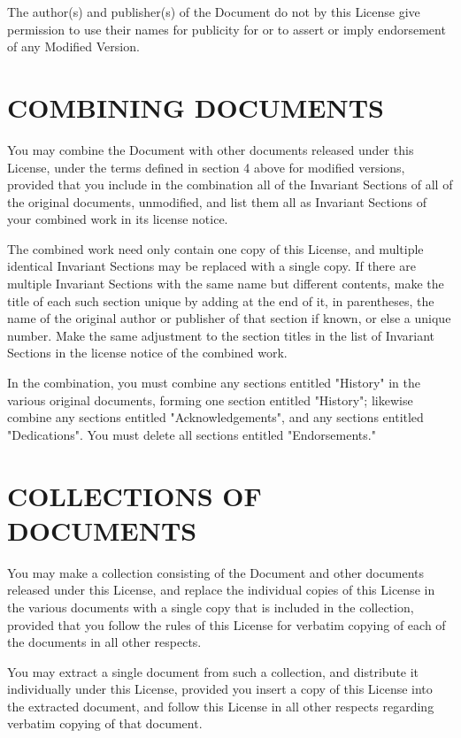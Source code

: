 The author(s) and publisher(s) of the Document do not by this License
give permission to use their names for publicity for or to assert or
imply endorsement of any Modified Version.

\section{COMBINING DOCUMENTS}\label{gfdl-5}

You may combine the Document with other documents released under this
License, under the terms defined in section 4 above for modified
versions, provided that you include in the combination all of the
Invariant Sections of all of the original documents, unmodified, and
list them all as Invariant Sections of your combined work in its license
notice.

The combined work need only contain one copy of this License, and
multiple identical Invariant Sections may be replaced with a single
copy. If there are multiple Invariant Sections with the same name but
different contents, make the title of each such section unique by adding
at the end of it, in parentheses, the name of the original author or
publisher of that section if known, or else a unique number. Make the
same adjustment to the section titles in the list of Invariant Sections
in the license notice of the combined work.

In the combination, you must combine any sections entitled "History" in
the various original documents, forming one section entitled "History";
likewise combine any sections entitled "Acknowledgements", and any
sections entitled "Dedications". You must delete all sections entitled
"Endorsements."

\section{COLLECTIONS OF DOCUMENTS}\label{gfdl-6}

You may make a collection consisting of the Document and other documents
released under this License, and replace the individual copies of this
License in the various documents with a single copy that is included in
the collection, provided that you follow the rules of this License for
verbatim copying of each of the documents in all other respects.

You may extract a single document from such a collection, and distribute
it individually under this License, provided you insert a copy of this
License into the extracted document, and follow this License in all
other respects regarding verbatim copying of that document.

